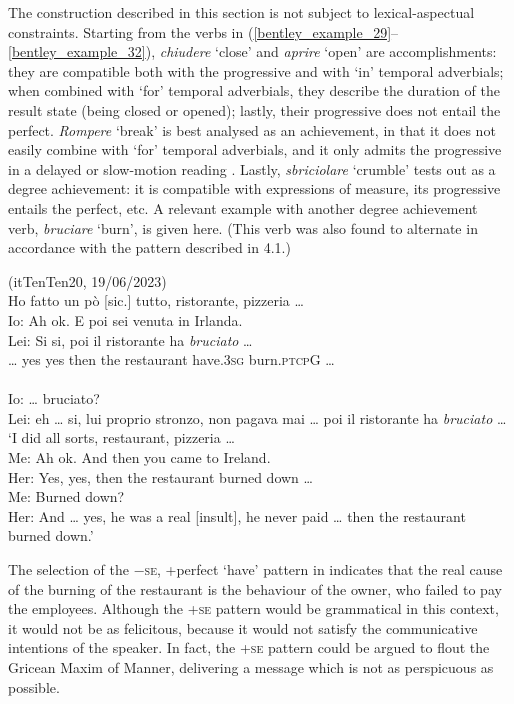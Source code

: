 \documentclass[output=paper,colorlinks,citecolor=brown
]{langscibook}
\begin{document}
The construction described in this section is not subject to lexical-aspectual constraints. Starting from the verbs in (\ref{bentley_example_29}--\ref{bentley_example_32}), \textit{chiudere} ‘close’ and \textit{aprire} ‘open’ are accomplishments: they are compatible both with the progressive and with ‘in’ temporal adverbials; when combined with ‘for’ temporal adverbials, they describe the duration of the result state (being closed or opened); lastly, their progressive does not entail the perfect. \textit{Rompere} ‘break’ is best analysed as an achievement, in that it does not easily combine with ‘for’ temporal adverbials, and it only admits the progressive in a delayed or slow-motion reading \citep{bertinetto2016tense,vivanco2021scalar}. Lastly, \textit{sbriciolare} ‘crumble’ tests out as a degree achievement: it is compatible with expressions of measure, its progressive entails the perfect, etc. A relevant example with another degree achievement verb, \textit{bruciare} ‘burn’, is given here. (This verb was also found to alternate in accordance with the pattern described in 4.1.)

\ea \label{bentley_example_34}(itTenTen20, 19/06/2023)\\
    Ho fatto un pò [sic.] tutto, ristorante, pizzeria \ldots\\
    Io: Ah ok. E poi sei venuta in Irlanda. \\
    \gll Lei: Si			si,			poi			il		ristorante	ha						\textit{bruciato}  \ldots\\
    {\ldots} yes		yes		then		the	restaurant	have.3\textsc{sg}	burn.\textsc{ptcp}G {\ldots} \\ \\
    {Io:  \ldots{} bruciato?  }\\
    {Lei: eh \ldots{} si, lui proprio stronzo, non pagava mai \ldots{}  poi il ristorante ha \textit{bruciato} \ldots} \\
    \glt 	‘I did all sorts, restaurant, pizzeria \ldots{}\\
            Me:	Ah ok. And then you came to Ireland. \\
            Her:	Yes, yes, then the restaurant burned down \ldots{}\\
            Me:	Burned down? \\
            		Her:	And \ldots{}  yes, he was a real [insult], he never paid \ldots{}  then the restaurant burned down.’
\z
   

The selection of the {−\textsc{se}, +perfect ‘have’} pattern in  indicates that the real cause of the burning of the restaurant is the behaviour of the owner, who failed to pay the employees. Although the +\textsc{se} pattern would be grammatical in this context, it would not be as felicitous, because it would not satisfy the communicative intentions of the speaker. In fact, the +\textsc{se} pattern could be argued to flout the Gricean Maxim of Manner, delivering a message which is not as perspicuous as possible.
\end{document}
